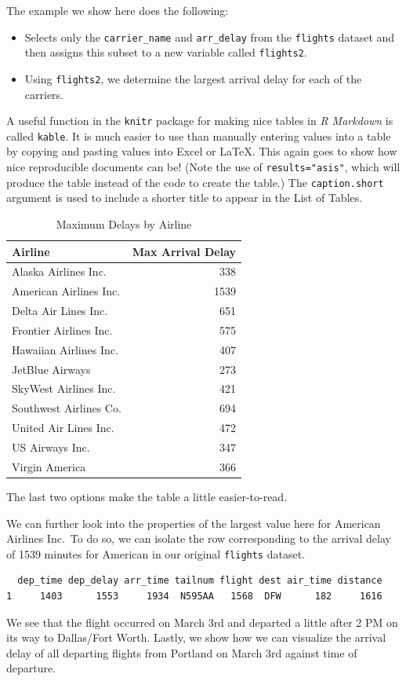 \documentclass[12pt,twoside]{reedthesis}
\theoremstyle{definition}
\theoremstyle{definition}
\theoremstyle{definition}
\theoremstyle{remark}
\begin{document}
The example we show here does the following:
\begin{itemize}
\item
  Selects only the \texttt{carrier\_name} and \texttt{arr\_delay} from
  the \texttt{flights} dataset and then assigns this subset to a new
  variable called \texttt{flights2}.
\item
  Using \texttt{flights2}, we determine the largest arrival delay for
  each of the carriers.
\end{itemize}
A useful function in the \texttt{knitr} package for making nice tables
in \emph{R Markdown} is called \texttt{kable}. It is much easier to use
than manually entering values into a table by copying and pasting values
into Excel or LaTeX. This again goes to show how nice reproducible
documents can be! (Note the use of \texttt{results="asis"}, which will
produce the table instead of the code to create the table.) The
\texttt{caption.short} argument is used to include a shorter title to
appear in the List of Tables.
\begin{longtable}[t]{lr}
\caption[Max Delays by Airline]{\label{tab:maxdelays}Maximum Delays by Airline}\\
\toprule
Airline & Max Arrival Delay\\
\midrule
Alaska Airlines Inc. & 338\\
American Airlines Inc. & 1539\\
Delta Air Lines Inc. & 651\\
Frontier Airlines Inc. & 575\\
Hawaiian Airlines Inc. & 407\\
\addlinespace
JetBlue Airways & 273\\
SkyWest Airlines Inc. & 421\\
Southwest Airlines Co. & 694\\
United Air Lines Inc. & 472\\
US Airways Inc. & 347\\
Virgin America & 366\\
\bottomrule
\end{longtable}
The last two options make the table a little easier-to-read.

We can further look into the properties of the largest value here for
American Airlines Inc.~To do so, we can isolate the row corresponding to
the arrival delay of 1539 minutes for American in our original
\texttt{flights} dataset.
\begin{verbatim}
  dep_time dep_delay arr_time tailnum flight dest air_time distance
1     1403      1553     1934  N595AA   1568  DFW      182     1616
\end{verbatim}
We see that the flight occurred on March 3rd and departed a little after
2 PM on its way to Dallas/Fort Worth. Lastly, we show how we can
visualize the arrival delay of all departing flights from Portland on
March 3rd against time of departure.
\end{document}
